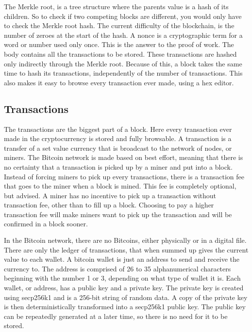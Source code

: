 \documentclass[11pt]{article}
\begin{document}
The Merkle root\cite{merkle}, is a tree structure where the parents value is a hash of its children. So to check if two competing blocks are different, you would only have to check the Merkle root hash. The current difficulty of the blockchain, is the number of zeroes at the start of the hash. A nonce is a cryptographic term for a word or number used only once. This is the answer to the proof of work. The body contains all the transactions to be stored. These transactions are hashed only indirectly through the Merkle root. Because of this, a block takes the same time to hash its transactions, independently of the number of transactions. This also makes it easy to browse every transaction ever made, using a hex editor.
 


\subsection{Transactions}

The transactions are the biggest part of a block. Here every transaction ever made in the cryptocurrency is stored and fully browsable. A transaction is a transfer of a set value currency that is broadcast to the network of nodes, or miners. The Bitcoin network is made based on best effort, meaning that there is no certainty that a transaction is picked up by a miner and put into a block. Instead of forcing miners to pick up every transactions, there is a transaction fee that goes to the miner when a block is mined. This fee is completely optional, but advised. A miner has no incentive to pick up a transaction without transaction fee, other than to fill up a block. Choosing to pay a higher transaction fee will make miners want to pick up the transaction and will be confirmed in a block sooner. 

In the Bitcoin network, there are no Bitcoins, either physically or in a digital file. There are only the ledger of transactions, that when summed up gives the current value to each wallet. A bitcoin wallet is just an address to send and receive the currency to. The address is comprised of 26 to 35 alphanumerical characters beginning with the number 1 or 3, depending on what type of wallet it is. Each wallet, or address, has a public key and a private key. The private key is created using secp256k1\cite{sigalg} and is a 256-bit string of random data. A copy of the private key is then deterministically transformed into a secp256k1 public key. The public key can be repeatedly generated at a later time, so there is no need for it to be stored. 
\end{document}
